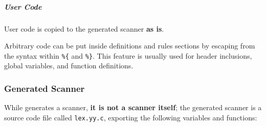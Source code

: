 \documentclass[english]{article}
\begin{document}
\subparagraph*{User Code}

User \clang code is copied to the generated scanner \textbf{as is}.

Arbitrary code can be put inside definitions and rules sections by escaping from the \flex syntax within \texttt{\%\{} and \texttt{\%\}}.
This feature is usually used for header inclusions, global variables, and function definitions.

\subsubsection{Generated Scanner}

While \flex generates a scanner, \textbf{it is not a scanner itself};
the generated scanner is a \clang source code file called \texttt{lex.yy.c}, exporting the following variables and functions:
\end{document}
